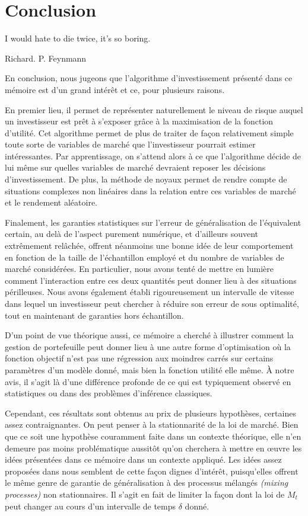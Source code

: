 \section{Conclusion}
\label{sec:conclusion}

\epigraph{I would hate to die twice, it's so boring.}{Richard. P. Feynmann}


En conclusion, nous jugeons que l'algorithme d'investissement présenté dans ce mémoire est
d'un grand intérêt et ce, pour plusieurs raisons.

En premier lieu, il permet de représenter naturellement le niveau de risque auquel un
investisseur est prêt à s'exposer grâce à la maximisation de la fonction d'utilité. Cet
algorithme permet de plus de traiter de façon relativement simple toute sorte de
variables de marché que l'investisseur pourrait estimer intéressantes. Par apprentissage,
on s'attend alors à ce que l'algorithme décide de lui même sur quelles variables de marché
devraient reposer les décisions d'investissement. De plus, la méthode de noyaux permet de
rendre compte de situations complexes non linéaires dans la relation entre ces variables
de marché et le rendement aléatoire.

Finalement, les garanties statistiques sur l'erreur de généralisation de l'équivalent
certain, au delà de l'aspect purement numérique, et d'ailleurs souvent extrêmement
relâchée, offrent néanmoins une bonne idée de leur comportement en fonction de la taille
de l'échantillon employé et du nombre de variables de marché considérées. En particulier,
nous avons tenté de mettre en lumière comment l'interaction entre ces deux quantités peut
donner lieu à des situations périlleuses. Nous avons également établi rigoureusement un
intervalle de vitesse dans lequel un investisseur peut chercher à réduire son erreur de
sous optimalité, tout en maintenant de garanties hors échantillon.

D'un point de vue théorique aussi, ce mémoire a cherché à illustrer comment la gestion de
portefeuille peut donner lieu à une autre forme d'optimisation où la fonction objectif
n'est pas une régression aux moindres carrés sur certains paramètres d'un modèle donné,
mais bien la fonction utilité elle même. À notre avis, il s'agit là d'une différence
profonde de ce qui est typiquement observé en statistiques ou dans des problèmes
d'inférence classiques.

Cependant, ces résultats sont obtenus au prix de plusieurs hypothèses, certaines assez
contraignantes. On peut penser à la stationnarité de la loi de marché. Bien que ce soit
une hypothèse couramment faite dans un contexte théorique, elle n'en demeure pas moins
problématique aussitôt qu'on cherchera à mettre en œuvre les idées présentées dans ce
mémoire dans un contexte appliqué. Les idées assez proposées dans
\cite{kuznetsov2017generalization} nous semblent de cette façon dignes d'intérêt,
puisqu'elles offrent le même genre de garantie de généralisation à des processus mélangés
\textsl{(mixing processes)} non stationnaires. Il s'agit en fait de limiter la façon dont
la loi de $M_t$ peut changer au cours d'un intervalle de temps $\delta$ donné.

